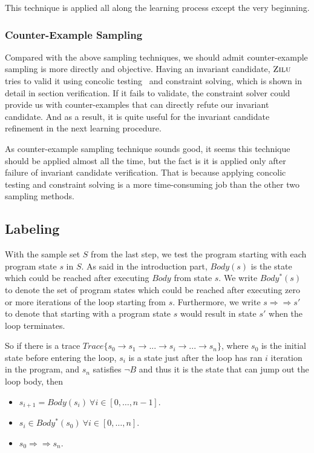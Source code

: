 This technique is applied all along the learning process except the very beginning.



\subsubsection{Counter-Example Sampling}
Compared with the above sampling techniques, we should admit counter-example sampling is more directly and objective.  
Having an invariant candidate, $\textsc{Zilu}$ tries to valid it using concolic testing~\cite{} and constraint solving,
which is shown in detail in section verification.
If it fails to validate, the constraint solver could provide us with counter-examples that can directly refute our invariant candidate.
And as a result, it is quite useful for the invariant candidate refinement in the next learning procedure.

As counter-example sampling technique sounds good, it seems this technique should be applied almost all the time, 
but the fact is it is applied only after failure of invariant candidate verification.
That is because applying concolic testing and constraint solving is a more time-consuming job than the other two sampling methods.


\subsection {Labeling}
With the sample set $S$ from the last step, we test the program starting with each program state $s$ in $S$. 
As said in the introduction part, $Body(s)$ is the state which could be reached after executing $Body$ from state $s$.
We write $Body^*(s)$ to denote the set of program states which could be reached after executing zero or more iterations of the loop starting from $s$.
Furthermore, we write $s \Rightarrow\Rightarrow s'$ to denote that starting with a program state $s$ would result in state $s'$ when the loop terminates. 

So if there is a trace $Trace\{s_0 \to s_1 \to ...\to s_i \to ... \to s_n\}$, 
where $s_0$ is the initial state before entering the loop, 
$s_i$ is a state just after the loop has ran $i$ iteration in the program,
and $s_n$ satisfies $\neg B$ and thus it is the state that can jump out the loop body,
then 
\begin{itemize}
\item $s_{i+1} = Body(s_i)\ \forall i \in [0, \ldots, n-1]$.
\item $s_{i} \in Body^*(s_0)\ \forall i \in [0, \ldots, n]$.
\item $s_{0} \Rightarrow\Rightarrow s_{n}$.
\end{itemize}




